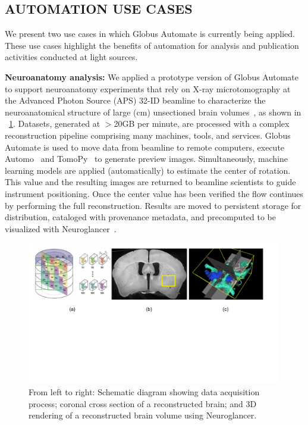 \documentclass{aip-cp}
\begin{document}
\subsection{AUTOMATION USE CASES}

We present two use cases in which Globus Automate is currently being applied. These
use cases highlight the benefits of automation for analysis and publication activities
conducted at light sources.

\textbf{Neuroanatomy analysis:} We applied a prototype version of Globus Automate
to support neuroanatomy experiments that rely on
X-ray microtomography at the Advanced Photon Source (APS) 32-ID beamline to
characterize the neuroanatomical structure of large (cm) unsectioned brain 
volumes~\cite{kasthuri2015saturated}, as shown in \figurename{~\ref{fig:brains}}. 
Datasets, generated at $>$20GB per minute, are processed
with a complex reconstruction pipeline 
comprising many machines, tools, and services.  
Globus Automate is used to move data from beamline to remote computers,
execute Automo~\cite{Automo} and TomoPy~\cite{gursoy2014tomopy} 
to generate preview images. Simultaneously, machine learning models
are applied (automatically) to estimate the center of rotation. This value and the resulting 
images are returned to beamline scientists to guide instrument positioning. Once the center value 
has been verified the flow continues by performing the full reconstruction. Results are moved to 
persistent storage for distribution, cataloged with
provenance metadata, and precomputed to be visualized with Neuroglancer~\cite{Neuroglancer}. 

\begin{figure}[t!]
	\centering
	\includegraphics[trim={0.7cm 8.6cm 1.5cm 0cm},clip,width=0.99\textwidth]{Figs/brains.pdf}
	\caption{From left to right: Schematic diagram showing data acquisition process;
	coronal cross section of a reconstructed brain; and
	3D rendering of a reconstructed brain volume using Neuroglancer.}
	\label{fig:brains}
\end{figure}
\end{document}
